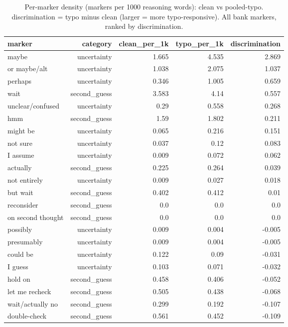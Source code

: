 \documentclass[11pt]{article}
\begin{document}
\begin{table}[H]
\centering
\caption{Per-marker density (markers per 1000 reasoning words): clean vs pooled-typo. discrimination = typo minus clean (larger = more typo-responsive). All bank markers, ranked by discrimination.}
\small
\begin{adjustbox}{max width=\textwidth}
\begin{tabular}{lrrrr}
\toprule
\textbf{marker} & \textbf{category} & \textbf{clean\_per\_1k} & \textbf{typo\_per\_1k} & \textbf{discrimination} \\
\midrule
maybe & uncertainty & 1.665 & 4.535 & 2.869 \\
or maybe/alt & uncertainty & 1.038 & 2.075 & 1.037 \\
perhaps & uncertainty & 0.346 & 1.005 & 0.659 \\
wait & second\_guess & 3.583 & 4.14 & 0.557 \\
unclear/confused & uncertainty & 0.29 & 0.558 & 0.268 \\
hmm & second\_guess & 1.59 & 1.802 & 0.211 \\
might be & uncertainty & 0.065 & 0.216 & 0.151 \\
not sure & uncertainty & 0.037 & 0.12 & 0.083 \\
I assume & uncertainty & 0.009 & 0.072 & 0.062 \\
actually & second\_guess & 0.225 & 0.264 & 0.039 \\
not entirely & uncertainty & 0.009 & 0.027 & 0.018 \\
but wait & second\_guess & 0.402 & 0.412 & 0.01 \\
reconsider & second\_guess & 0.0 & 0.0 & 0.0 \\
on second thought & second\_guess & 0.0 & 0.0 & 0.0 \\
possibly & uncertainty & 0.009 & 0.004 & -0.005 \\
presumably & uncertainty & 0.009 & 0.004 & -0.005 \\
could be & uncertainty & 0.122 & 0.09 & -0.031 \\
I guess & uncertainty & 0.103 & 0.071 & -0.032 \\
hold on & second\_guess & 0.458 & 0.406 & -0.052 \\
let me recheck & second\_guess & 0.505 & 0.438 & -0.068 \\
wait/actually no & second\_guess & 0.299 & 0.192 & -0.107 \\
double-check & second\_guess & 0.561 & 0.452 & -0.109 \\
\bottomrule
\end{tabular}
\end{adjustbox}
\end{table}
\end{document}
